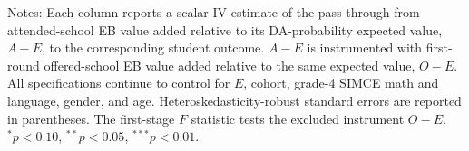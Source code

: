 \begin{table}[!htbp]
\centering
\caption{Main scalar school-value IV estimates using deviations from expected value added}
\label{tab:scalar_school_value_iv_main_five_surprise_eb}
\par\medskip
\footnotesize
\begin{minipage}{\textwidth}
Notes: Each column reports a scalar IV estimate of the pass-through from attended-school EB value added relative to its DA-probability expected value, $A-E$, to the corresponding student outcome. $A-E$ is instrumented with first-round offered-school EB value added relative to the same expected value, $O-E$. All specifications continue to control for $E$, cohort, grade-4 SIMCE math and language, gender, and age. Heteroskedasticity-robust standard errors are reported in parentheses. The first-stage $F$ statistic tests the excluded instrument $O-E$. $^{*}p<0.10$, $^{**}p<0.05$, $^{***}p<0.01$.
\end{minipage}
\end{table}
